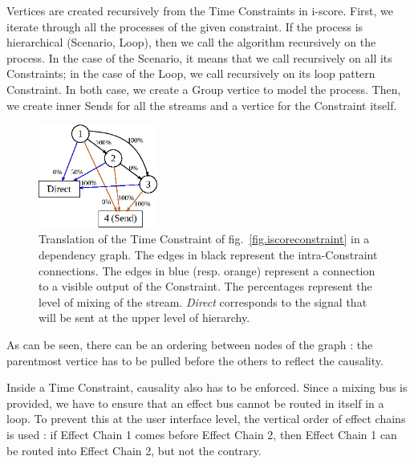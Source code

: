 \documentclass{article}
\begin{document}
Vertices are created recursively from the Time Constraints in i-score.
First, we iterate through all the processes of the given constraint.
If the process is hierarchical (Scenario, Loop), then we call the algorithm recursively on the process.
In the case of the Scenario, it means that we call recursively on all its Constraints; in the case of the Loop, we call recursively on its loop pattern Constraint.
In both case, we create a Group vertice to model the process.
Then, we create inner Sends for all the streams and a vertice for the Constraint itself.

\begin{figure}
	\centering
	\includegraphics[width=0.35\textwidth]{figures/graph1.eps}
	\caption{Translation of the Time Constraint of fig.~\ref{fig.iscoreconstraint} in a dependency graph.
		The edges in black represent the intra-Constraint connections. 
		The edges in blue (resp. orange) represent a connection to a visible output of 
		the Constraint. The percentages represent the level of mixing of the stream.
		\textit{Direct} corresponds to the signal that will be sent at the upper level of hierarchy.}
	\label{fig.graph}
\end{figure}

As can be seen, there can be an ordering between nodes of the graph : the parentmost vertice
has to be pulled before the others to reflect the causality.

Inside a Time Constraint, causality also has to be enforced. 
Since a mixing bus is provided, we have to ensure that an effect bus cannot be routed in 
itself in a loop. 
To prevent this at the user interface level, the vertical order of effect chains is used : 
if Effect Chain 1 comes before Effect Chain 2, then Effect Chain 1 can be routed into Effect Chain 2, but not the contrary.
\end{document}
